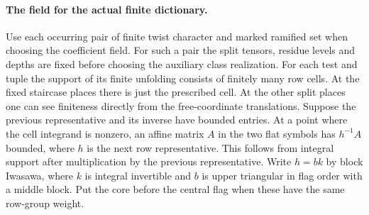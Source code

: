 \paragraph{The field for the actual finite dictionary.}
Use each occurring pair of finite twist character and marked
ramified set when choosing the coefficient field. For such a
pair the split tensors, residue levels and depths are fixed
before choosing the auxiliary class realization. For each
test and tuple the support of its finite unfolding consists
of finitely many row cells. At the fixed staircase places
there is just the prescribed cell. At the other split places
one can see finiteness directly from the free-coordinate
translations. Suppose the previous representative and its
inverse have bounded entries. At a point where the cell
integrand is nonzero, an affine matrix \(A\) in the two
flat symbols has \(h^{-1}A\) bounded, where \(h\) is the next
row representative. This follows from integral support
after multiplication by the previous representative.
Write \(h=bk\) by block Iwasawa, where \(k\) is integral
invertible and \(b\) is upper triangular in flag order with
a middle block. Put the core before the central flag when
these have the same row-group weight.

